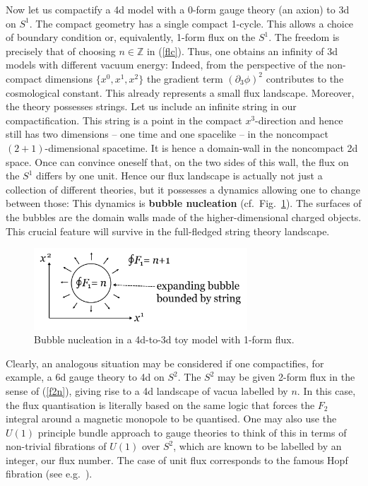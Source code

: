 \documentclass[12pt]{article}
\numberwithin{equation}{section}
\begin{document}
Now let us compactify a 4d model with a $0$-form gauge theory (an axion) to 3d on $S^1$. The compact geometry has a single compact 1-cycle. This allows a choice of boundary condition or, equivalently, 1-form flux on the $S^1$. The freedom is precisely that of choosing $n\in \mathbb{Z}$ in (\ref{flc}). 
Thus, one obtains an infinity of 3d models with different vacuum energy: Indeed, from the perspective of the non-compact dimensions $\{x^0,x^1,x^2\}$ the gradient term $(\partial_3\phi)^2$ contributes to the cosmological constant. This already represents a small flux landscape. Moreover, the theory possesses strings. Let us include an infinite string in our compactification. This string is a point in the compact $x^3$-direction and hence still has two dimensions -- one time and one spacelike -- in the noncompact $(2+1)$-dimensional spacetime. It is hence a domain-wall in the noncompact 2d space. Once can convince oneself that, on the two sides of this wall, the flux on the $S^1$ differs by one unit. Hence our flux landscape is actually not just a collection of different theories, but it possesses a dynamics allowing one to change between those: This dynamics is {\bf bubble nucleation} (cf.~Fig.~\ref{bst}). The surfaces of the bubbles are the domain walls made of the higher-dimensional charged objects. This crucial feature will survive in the full-fledged string theory landscape. 

\begin{figure}[ht]
\begin{center} 
\includegraphics[width=8cm]{bst.png}
\caption{Bubble nucleation in a 4d-to-3d toy model with 1-form flux.}
\label{bst} 
\end{center}
\end{figure}

Clearly, an analogous situation may be considered if one compactifies, for example, a 6d gauge theory to 4d on $S^2$. The $S^2$ may be given 2-form flux in the sense of (\ref{f2n}), giving rise to a 4d landscape of vacua labelled by $n$. In this case, the flux quantisation is literally based on the same logic that forces the $F_2$ integral around a magnetic monopole to be quantised. One may also use the $U(1)$ principle bundle approach to gauge theories to think of this in terms of non-trivial fibrations of $U(1)$ over $S^2$, which are known to be labelled by an integer, our flux number. The case of unit flux corresponds to the famous Hopf fibration (see e.g.~\cite{nak, bert, nashsen, gs}). 
\end{document}
